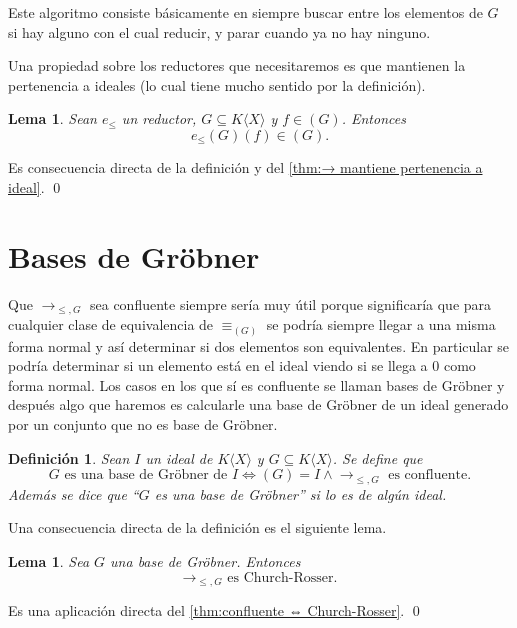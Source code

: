 \documentclass[12pt]{report}
\theoremstyle{customstyle}
\newtheorem{definition}[theorem]{Definición}
\newtheorem{lemma}[theorem]{Lema}
\renewenvironment{proof}[1][\proofname]{{\noindent \bfseries #1: }}{\qed} %
\theoremstyle{factstyle}
\begin{document}
Este algoritmo consiste básicamente en siempre buscar entre los elementos de $G$ si hay alguno con el cual reducir, y parar cuando ya no hay ninguno.

Una propiedad sobre los reductores que necesitaremos es que mantienen la pertenencia a ideales (lo cual tiene mucho sentido por la definición).

\begin{lemma}\label{lemma:e mantiene pertenencia a ideal}
  Sean $e_≤$ un reductor, $G ⊆ K⟨X⟩$ y $f ∈ (G)$. Entonces
  \[ e_≤(G)(f) ∈ (G) \text{.}\]
\end{lemma}
\begin{proof}
  Es consecuencia directa de la definición y del \cref{thm:→ mantiene pertenencia a ideal}.
\end{proof}

\section{Bases de Gröbner}

Que $→_{≤, G}$ sea confluente siempre sería muy útil porque significaría que para cualquier clase de equivalencia de $≡_{(G)}$ se podría siempre llegar a una misma forma normal y así determinar si dos elementos son equivalentes. En particular se podría determinar si un elemento está en el ideal viendo si se llega a $0$ como forma normal. Los casos en los que sí es confluente se llaman bases de Gröbner y después algo que haremos es calcularle una base de Gröbner de un ideal generado por un conjunto que no es base de Gröbner.

\begin{definition}\label{def:base de Gröbner}
  Sean $I$ un ideal de $K⟨X⟩$ y $G ⊆ K⟨X⟩$. Se define que
  \[G\text{ es una base de Gröbner de }I ⇔ (G) = I ∧ →_{≤, G}\text{ es confluente} \text{.} \]
  Además se dice que ``$G$ es una base de Gröbner'' si lo es de algún ideal.
\end{definition}

Una consecuencia directa de la definición es el siguiente lema.

\begin{lemma}\label{lemma:→ gröbner es Church-Rosser}
  Sea $G$ una base de Gröbner. Entonces
  \[→_{≤, G}\text{ es Church-Rosser.}\]
\end{lemma}
\begin{proof}
  Es una aplicación directa del \cref{thm:confluente ⇔ Church-Rosser}.
\end{proof}
\end{document}
